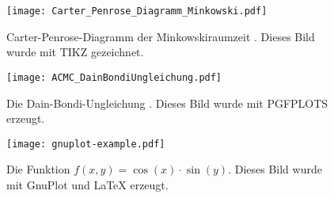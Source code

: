\lipsum[2]

\begin{figure}[ht!]
\centering
\texttt{[image: Carter\_Penrose\_Diagramm\_Minkowski.pdf]}
\caption{Carter-Penrose-Diagramm der Minkowskiraumzeit \cite{Penrose:1965}. Dieses Bild wurde mit TIKZ gezeichnet.}
\label{fig:CarterPenrose_Minkowski}
\end{figure}

\lipsum[3]

\begin{figure}[ht!]
\centering
\texttt{[image: ACMC\_DainBondiUngleichung.pdf]}
\caption{Die Dain-Bondi-Ungleichung \cite{Schinkel:2013}. Dieses Bild wurde mit PGFPLOTS erzeugt.}
\label{fig:Expansionen_Schwarzschild}
\end{figure}

\lipsum[5]

\begin{figure}[ht!]
\centering
\texttt{[image: gnuplot-example.pdf]}
\caption{Die Funktion $f(x,y)=\cos(x)\cdot\sin(y)$. Dieses Bild wurde mit GnuPlot und \LaTeX{} erzeugt.}
\label{fig:cos_x_sin_y}
\end{figure}

\lipsum[7]